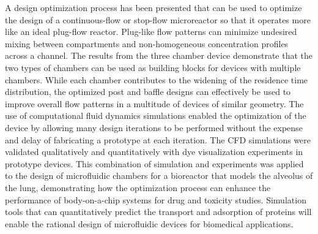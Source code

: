 A design optimization process has been presented that can be used
to optimize the design of a continuous-flow or stop-flow microreactor
so that it operates more like an ideal plug-flow reactor. Plug-like
flow patterns can minimize undesired mixing between compartments and
non-homogeneous concentration profiles across a channel. The results
from the three chamber device demonstrate that the two types of chambers
can be used as building blocks for devices with multiple chambers.
While each chamber contributes to the widening of the residence time
distribution, the optimized post and baffle designs can effectively
be used to improve overall flow patterns in a multitude of devices
of similar geometry. The use of computational fluid dynamics simulations
enabled the optimization of the device by allowing many design iterations
to be performed without the expense and delay of fabricating a prototype
at each iteration. The CFD simulations were validated qualitatively
and quantitatively with dye visualization experiments in prototype
devices. This combination of simulation and experiments was applied
to the design of microfluidic chambers for a bioreactor that models
the alveolus of the lung, demonstrating how the optimization process
can enhance the performance of body-on-a-chip systems for drug and
toxicity studies. Simulation tools that can quantitatively predict
the transport and adsorption of proteins will enable the rational
design of microfluidic devices for biomedical applications.
